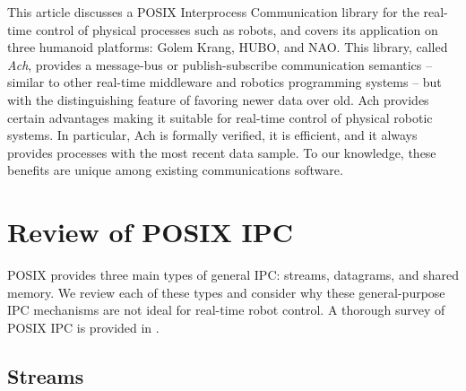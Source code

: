 \documentclass[letterpaper]{IEEEtran}
\begin{document}
This article discusses a POSIX Interprocess Communication library for
the real-time control of physical processes such as robots, and covers
its application on three humanoid platforms: Golem Krang, HUBO, and
NAO.  This library, called \emph{Ach}, provides a message-bus or
publish-subscribe communication semantics -- similar to other
real-time middleware and robotics programming systems
\cite{dds2007,Quigley09} -- but with the distinguishing feature of
favoring newer data over old.  Ach provides certain advantages making
it suitable for real-time control of physical robotic systems.  In
particular, Ach is formally verified, it is efficient, and it always
provides processes with the most recent data sample.  To our
knowledge, these benefits are unique among existing communications
software.



\section{Review of POSIX IPC}

\label{sect:reviewipc}

POSIX provides three main types of general IPC: streams, datagrams,
and shared memory.  We review each of these types and consider why
these general-purpose IPC mechanisms are not ideal for real-time robot
control.  A thorough survey of POSIX IPC is provided in \cite{apue}.

\subsection{Streams}
\end{document}
